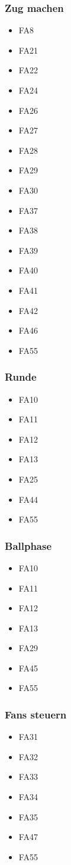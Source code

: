 \subsubsection{Zug machen}
\begin{itemize} 
	\item FA8
	\item FA21 
	\item FA22 
	\item FA24 
	\item FA26 
	\item FA27 
	\item FA28 
	\item FA29 
	\item FA30 
	\item FA37 
	\item FA38 
	\item FA39 
	\item FA40 
	\item FA41 
	\item FA42 
	\item FA46 
	\item FA55 
\end{itemize}
\subsubsection{Runde}
\begin{itemize} 
	\item FA10
	\item FA11 
	\item FA12 
	\item FA13 
	\item FA25 
	\item FA44 
	\item FA55 
\end{itemize}
\subsubsection{Ballphase}
\begin{itemize} 
	\item FA10
	\item FA11 
	\item FA12 
	\item FA13 
	\item FA29 
	\item FA45 
	\item FA55 
\end{itemize}
\subsubsection{Fans steuern}
\begin{itemize} 
	\item FA31
	\item FA32 
	\item FA33 
	\item FA34 
	\item FA35 
	\item FA47 
	\item FA55 
\end{itemize}
